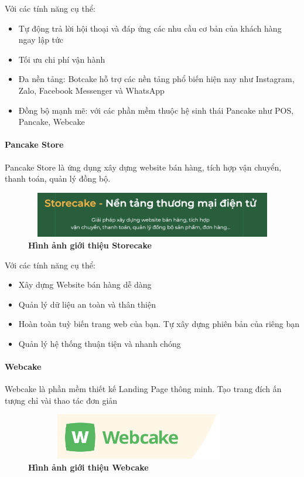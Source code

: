 Với các tính năng cụ thể: 
\begin{itemize}
  \item Tự động trả lời hội thoại và đáp ứng các nhu cầu cơ bản của khách hàng ngay lập tức
  \item Tối ưu chi phí vận hành
  \item Đa nền tảng: Botcake hỗ trợ các nền tảng phổ biến hiện nay như Instagram, Zalo, Facebook Messenger và WhatsApp
  \item Đồng bộ mạnh mẽ: với các phần mềm thuộc hệ sinh thái Pancake như POS, Pancake, Webcake
\end{itemize}

\paragraph{Pancake Store \cite{storecake}}
\mbox{}

Pancake Store là ứng dụng xây dựng website bán hàng, tích hợp vận chuyển, thanh toán, quản lý đồng bộ.
\begin{figure}[H]
  \centering
  \includegraphics[width=16cm,height=2cm]{Images/pancake/storecake.png}
  \caption[Hình ảnh giới thiệu Storecake]{\bfseries \fontsize{12pt}{0pt}
  \selectfont Hình ảnh giới thiệu Storecake}
  \label{ttlk} %
\end{figure}

Với các tính năng cụ thể: 
\begin{itemize}
  \item Xây dựng Website bán hàng dễ dàng
  \item Quản lý dữ liệu an toàn và thân thiện
  \item Hoàn toàn tuỳ biến trang web của bạn. Tự xây dựng phiên bản của riêng bạn
  \item Quản lý hệ thống thuận tiện và nhanh chóng
\end{itemize}

\paragraph{Webcake \cite{webcake}}
\mbox{}

Webcake là phần mềm thiết kế Landing Page thông minh. Tạo trang đích ấn tượng chỉ vài thao tác đơn giản
\begin{figure}[H]
  \centering
  \includegraphics[width=10cm,height=2cm]{Images/pancake/webcake.png}
  \caption[Hình ảnh giới thiệu Webcake]{\bfseries \fontsize{12pt}{0pt}
  \selectfont Hình ảnh giới thiệu Webcake}
  \label{ttlk} %
\end{figure}

